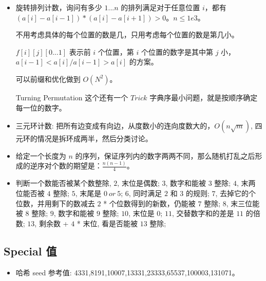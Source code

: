 \documentclass[a4paper,12pt]{article}
\begin{document}
\begin{itemize}
    \item 旋转排列计数，询问有多少 \(1...n\) 的排列满足对于任意位置 \(i\)，都有 \((a[i]-a[i-1])*(a[i]-a[i+1])>0\)。\(n \leq 1e3\)。
    
    不用考虑具体的每个位置的数是几，只用考虑每个位置的数是第几小。
    
    \(f[i][j][0...1]\) 表示前 \(i\) 个位置，第 \(i\) 个位置的数字是其中第 $j$ 小， \(a[i-1]<a[i] / a[i-1]>a[i]\) 的方案。

    可以前缀和优化做到 \(O(N^2)\)。
    
    Turning Permutation 这个还有一个 \(Trick\) 字典序最小问题，就是按顺序确定每一位的数字。

    \item 三元环计数: 把所有边变成有向边，从度数小的连向度数大的，$O(n\sqrt{m})$, 四元环的情况是拆环成两半，然后分类讨论。

    \item 给定一个长度为 \(n\) 的序列，保证序列内的数字两两不同，那么随机打乱之后形成的逆序对个数的期望是：\(\frac{n(n-1)}{4}\)。

    \item 判断一个数能否被某个数整除, 
          \(2\), 末位是偶数; 
          \(3\), 数字和能被 \(3\) 整除;
          \(4\), 末两位能否被 \(4\) 整除; 
          \(5\), 末尾是 \(0 \ or \ 5\);
          \(6\), 同时满足 \(2\) 和 \(3\) 的规则; 
          \(7\), 去掉它的个位数，并用剩下的数减去 \(2\) * 个位数得到的新数，仍能被 \(7\) 整除;
          \(8\), 末三位能被 \(8\) 整除;
          \(9\), 数字和能被 \(9\) 整除;
          \(10\), 末位是 \(0\);
          \(11\), 交替数字和的差是 \(11\) 的倍数;
          \(13\), 剩余数 + \(4\) * 末位, 看是否能被 \(13\) 整除;

\end{itemize}

\subsection{Special 值}

\begin{itemize}
    \item 哈希 seed 参考值: 4331,8191,10007,13331,23333,65537,100003,131071。
\end{itemize}

\newpage
\end{document}
